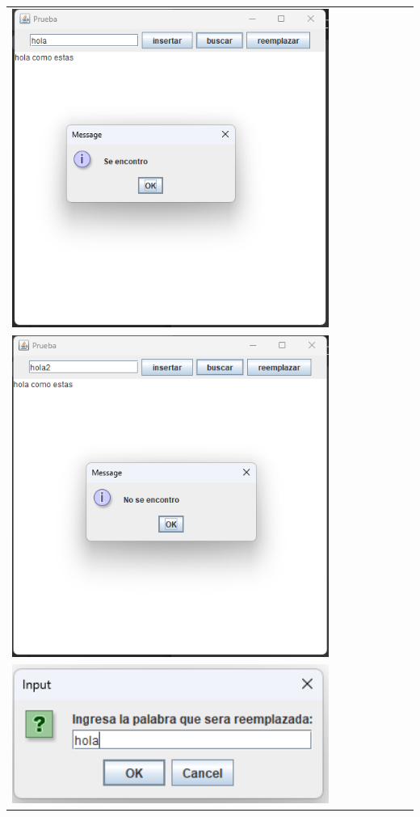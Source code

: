 \documentclass[9pt]{article}
\begin{document}
\begin{longtable}{|p{15cm}|}
		\includegraphics[width=0.8\textwidth,keepaspectratio]{img/buscandoPalabra.png}\\
		\includegraphics[width=0.8\textwidth,keepaspectratio]{img/buscandoPalabra2.png}\\
		\includegraphics[width=0.8\textwidth,keepaspectratio]{img/reemplazando1.png}\\

\end{longtable}
\end{document}
